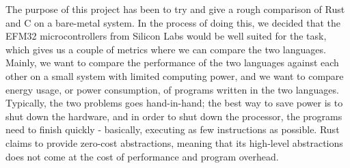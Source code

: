 The purpose of this project has been to try and give a rough comparison of Rust and C on a bare-metal system.
In the process of doing this, we decided that the EFM32 microcontrollers from Silicon Labs would be well suited for the task, which gives us a couple of metrics where we can compare the two languages.
Mainly, we want to compare the performance of the two languages against each other on a small system with limited computing power, and we want to compare energy usage, or power consumption, of programs written in the two languages.
Typically, the two problems goes hand-in-hand; the best way to save power is to shut down the hardware, and in order to shut down the processor, the programs need to finish quickly - basically, executing as few instructions as possible.
Rust claims to provide zero-cost abstractions, meaning that its high-level abstractions does not come at the cost of performance and program overhead.

